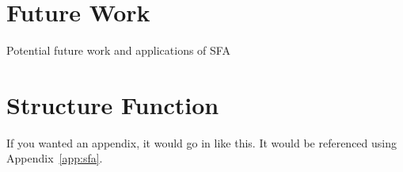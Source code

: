 \documentclass[12pt, oneside]{smuthesis}
\begin{document}
\chapter{\sc Future Work} \label{futureWork}

Potential future work and applications of SFA


\appendix

\chapter{Structure Function} \label{appendixSFA}
\label{app:sfa}
If you wanted an appendix, it would go in like this.  It would be 
referenced using Appendix~\ref{app:sfa}.


\begin{singlespace}

\end{singlespace}
\end{document}
